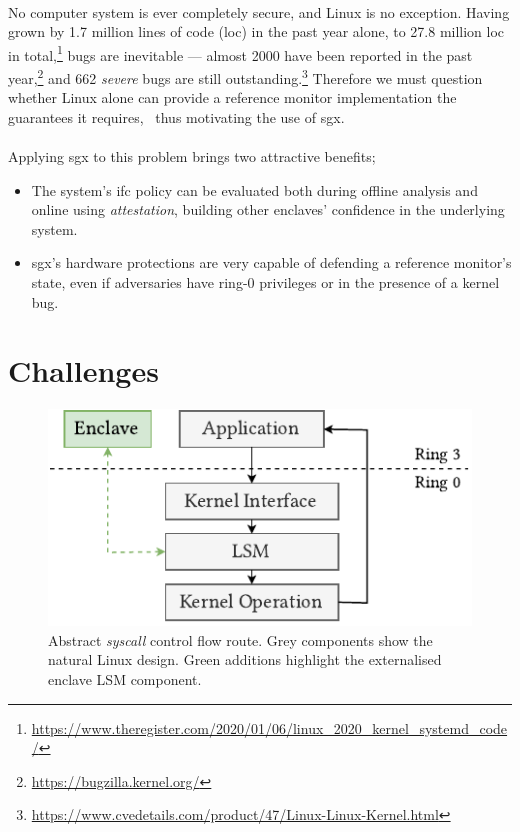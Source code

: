 \paragraph{} No computer system is ever completely secure, and Linux is no exception. Having grown by 1.7 million lines of code (\acrshort{loc}) in the past year alone, to 27.8 million \acrshort{loc} in total,\footnote{\url{https://www.theregister.com/2020/01/06/linux\_2020\_kernel\_systemd\_code/}} bugs are inevitable --- almost 2000 have been reported in the past year,\footnote{\url{https://bugzilla.kernel.org/}} and 662 \textit{severe} bugs are still outstanding.\footnote{\url{https://www.cvedetails.com/product/47/Linux-Linux-Kernel.html}} Therefore we must question whether Linux alone can provide a reference monitor implementation the guarantees it requires,~\cite{Lipp2018MeltdownRK, 10.5555/2831143.2831164} thus motivating the use of \acrshort{sgx}.

\paragraph{} Applying \acrshort{sgx} to this problem brings two attractive benefits;
\begin{itemize}
    \item The system's \acrshort{ifc} policy can be evaluated both during offline analysis and online using \textit{attestation}, building other enclaves' confidence in the underlying system.
    \item \acrshort{sgx}'s hardware protections are very capable of defending a reference monitor's state, even if adversaries have ring-0 privileges or in the presence of a kernel bug.
\end{itemize}


\section{Challenges}
\label{sec:challenges}

\begin{figure}[]
    \centering
    \includegraphics[width=0.48\linewidth]{figures/SGX-EnclaveIntegration.pdf}
    \caption[Abstract \textit{syscall} control flow route for enclave integration.]{Abstract \textit{syscall} control flow route. Grey components show the natural Linux design. Green additions highlight the externalised enclave LSM component.}
    \vspace{5mm}
    \label{fig:sgx-abstract-integration}
\end{figure}

